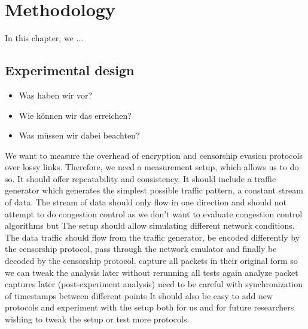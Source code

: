 
\chapter{Methodology}
\label{chap:methodology}

In this chapter, we ...

\section{Experimental design}
\begin{itemize}
	\item Was haben wir vor?
	\item Wie können wir das erreichen?
	\item Was müssen wir dabei beachten?
\end{itemize}
We want to measure the overhead of encryption and censorship evasion protocols over lossy links.
Therefore, we need a measurement setup, which allows us to do so.
It should offer repeatability and consistency.
It should include a traffic generator which generates the simplest possible traffic pattern, a constant stream of data.
The stream of data should only flow in one direction and should not attempt to do congestion control as we don't want to evaluate congestion control algorithms but 
The setup should allow simulating different network conditions.
The data traffic should flow from the traffic generator, be encoded differently by the censorship protocol, pass through the network emulator and finally be decoded by the censorship protocol.
capture all packets in their original form so we can tweak the analysis later without rerunning all tests again
analyze packet captures later (post-experiment analysis)
need to be careful with synchronization of timestamps between different points
It should also be easy to add new protocols and experiment with the setup both for us and for future researchers wishing to tweak the setup or test more protocols.

